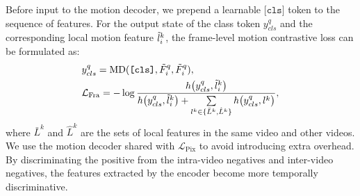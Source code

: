 \documentclass[sigconf,screen]{acmart}
\begin{document}
Before input to the motion decoder, we prepend a learnable $\texttt{[cls]}$ token to the sequence of features. For the output state of the class token $y_{cls}^q$ and the corresponding local motion feature $\Tilde{l}_i^k$, the frame-level motion contrastive loss can be formulated as:
\begin{align}\label{eq9}
& y_{cls}^q = \mathrm{MD}(\texttt{[cls]},\Tilde{F}_i^q,\Tilde{F}_i^q), \\\label{eq10}
& \mathcal{L}_{\mathrm{Fra}}=-\log \frac{h\big(y_{cls}^q, \Tilde{l}_i^k\big)}
{h\big(y_{cls}^q, \Tilde{l}_i^k\big)+\sum\limits_{l^k \in \{\bar{L}^k,\hat{L}^k\}} h\big(y_{cls}^q, l^k\big)},
\end{align}
where $\bar{L}^k$ and $\hat{L}^k$ are the sets of local features in the same video and other videos. We use the motion decoder shared with $\mathcal{L}_{\mathrm{Pix}}$ to avoid introducing extra overhead.
By discriminating the positive from the intra-video negatives and inter-video negatives, the features extracted by the encoder become more temporally discriminative.
\end{document}
